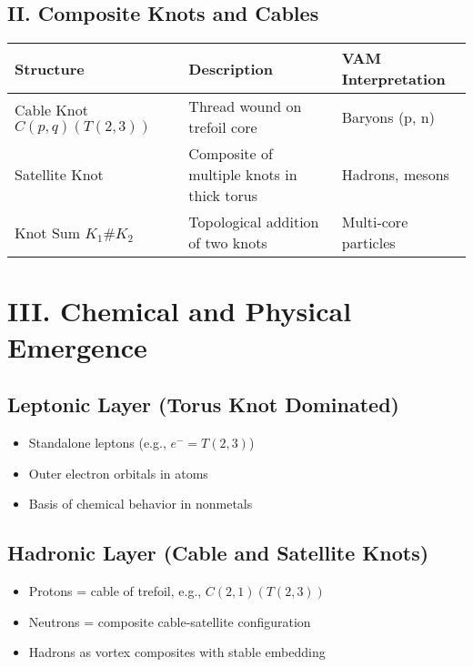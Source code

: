 \documentclass[12pt]{article}
\begin{document}
\subsection*{II. Composite Knots and Cables}
\begin{center}
    \footnotesize
    \begin{tabular}{|l|p{8cm}|l|}
        \hline
        \textbf{Structure} & \textbf{Description} & \textbf{VAM Interpretation} \\
        \hline
        Cable Knot \( C(p,q)(T(2,3)) \) & Thread wound on trefoil core & Baryons (p, n) \\
        Satellite Knot & Composite of multiple knots in thick torus & Hadrons, mesons \\
        Knot Sum \( K_1 \# K_2 \) & Topological addition of two knots & Multi-core particles \\
        \hline
    \end{tabular}
\end{center}

\section*{III. Chemical and Physical Emergence}

\subsection*{Leptonic Layer (Torus Knot Dominated)}
\begin{itemize}
    \item Standalone leptons (e.g., \( e^- = T(2,3) \))
    \item Outer electron orbitals in atoms
    \item Basis of chemical behavior in nonmetals
\end{itemize}

\subsection*{Hadronic Layer (Cable and Satellite Knots)}
\begin{itemize}
    \item Protons = cable of trefoil, e.g., \( C(2,1)(T(2,3)) \)
    \item Neutrons = composite cable-satellite configuration
    \item Hadrons as vortex composites with stable embedding
\end{itemize}
\end{document}
